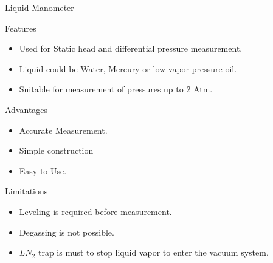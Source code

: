 \documentclass[11pt]{beamer}
\begin{document}
\begin{frame}{Liquid Manometer}

\begin{exampleblock}{Features}
               
           \begin{itemize}
           
           		\item Used for Static head and differential pressure  measurement.
 
           		\item Liquid could be Water, Mercury or low vapor pressure oil.
           
          	    \item Suitable for measurement of pressures up to 2 Atm.
           
          \end{itemize}
              
       \end{exampleblock}



\begin{exampleblock}{Advantages}
         
          \begin{itemize}
           
           \item Accurate Measurement. 

           \item Simple construction
           
           \item  Easy to Use.
           
          \end{itemize}
        
       
       \end{exampleblock}
       
       \begin{exampleblock}{Limitations}
          \begin{itemize}
           
           \item Leveling is required before measurement.
           \item Degassing is not possible. 
           
           \item $ LN_{2}$ trap is must to stop liquid vapor to enter the vacuum system. 
           
          \end{itemize}
        
       
       \end{exampleblock}


     


\end{frame}
\end{document}
